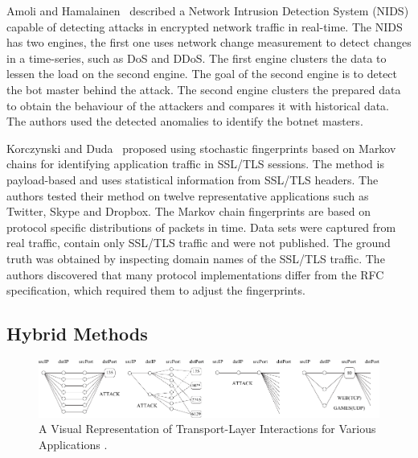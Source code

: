 Amoli and Hamalainen~\cite{Amoli-2013-real} described a Network Intrusion Detection System (NIDS) capable of detecting attacks in encrypted network traffic in real-time. The NIDS has two engines, the first one uses network change measurement to detect changes in a time-series, such as DoS and DDoS. The first engine clusters the data to lessen the load on the second engine. The goal of the second engine is to detect the bot master behind the attack. The second engine clusters the prepared data to obtain the behaviour of the attackers and compares it with historical data. The authors used the detected anomalies to identify the botnet masters.

Korczynski and Duda~\cite{Korczynski-2014-Markov} proposed using stochastic fingerprints based on Markov chains for identifying application traffic in SSL/TLS sessions. The method is payload-based and uses statistical information from SSL/TLS headers. The authors tested their method on twelve representative applications such as Twitter, Skype and Dropbox. The Markov chain fingerprints are based on protocol specific distributions of packets in time. Data sets were captured from real traffic, contain only SSL/TLS traffic and were not published. The ground truth was obtained by inspecting domain names of the SSL/TLS traffic. The authors discovered that many protocol implementations differ from the RFC specification, which required them to adjust the fingerprints.

\subsection{Hybrid Methods}\label{subsec:hybrid}

\begin{figure}[!t]
	\begin{center}
		\includegraphics[width=0.9\linewidth]{figures/paper-encrypted/graphlets}
		\caption{A Visual Representation of Transport-Layer Interactions for Various Applications \cite{Karagiannis-2005-BLINC}.}
		\label{fig:graphlets}
	\end{center}
\end{figure}

